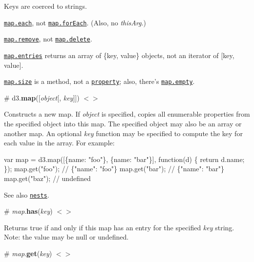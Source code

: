 \begin{DoxyItemize}
\item Keys are coerced to strings.
\item \href{#map_each}{\tt map.\+each}, not \href{https://developer.mozilla.org/en-US/docs/Web/JavaScript/Reference/Global_Objects/Map/forEach}{\tt map.\+for\+Each}. (Also, no {\itshape this\+Arg}.)
\item \href{#map_remove}{\tt map.\+remove}, not \href{https://developer.mozilla.org/en-US/docs/Web/JavaScript/Reference/Global_Objects/Map/delete}{\tt map.\+delete}.
\item \href{#map_entries}{\tt map.\+entries} returns an array of \{key, value\} objects, not an iterator of \mbox{[}key, value\mbox{]}.
\item \href{#map_size}{\tt map.\+size} is a method, not a \href{https://developer.mozilla.org/en-US/docs/Web/JavaScript/Reference/Global_Objects/Map/size}{\tt property}; also, there’s \href{#map_empty}{\tt map.\+empty}.
\end{DoxyItemize}

\label{_map}%
\# d3.{\bfseries map}(\mbox{[}{\itshape object}\mbox{[}, {\itshape key}\mbox{]}\mbox{]}) \href{https://github.com/d3/d3-collection/blob/master/src/map.js}{\tt $<$$>$}

Constructs a new map. If {\itshape object} is specified, copies all enumerable properties from the specified object into this map. The specified object may also be an array or another map. An optional {\itshape key} function may be specified to compute the key for each value in the array. For example\+:


\begin{DoxyCode}
var map = d3.map([\{name: "foo"\}, \{name: "bar"\}], function(d) \{ return d.name; \});
map.get("foo"); // \{"name": "foo"\}
map.get("bar"); // \{"name": "bar"\}
map.get("baz"); // undefined
\end{DoxyCode}


See also \href{#nests}{\tt nests}.

\label{_map_has}%
\# {\itshape map}.{\bfseries has}({\itshape key}) \href{https://github.com/d3/d3-collection/blob/master/src/map.js#L7}{\tt $<$$>$}

Returns true if and only if this map has an entry for the specified {\itshape key} string. Note\+: the value may be {\ttfamily null} or {\ttfamily undefined}.

\label{_map_get}%
\# {\itshape map}.{\bfseries get}({\itshape key}) \href{https://github.com/d3/d3-collection/blob/master/src/map.js#L10}{\tt $<$$>$}

